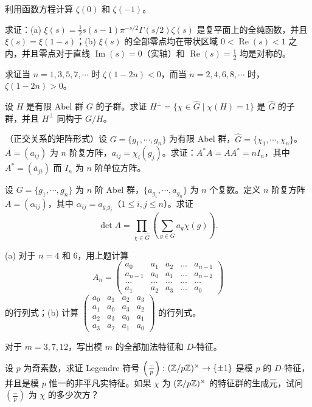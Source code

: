 \begin{Exercises}
  \item 利用函数方程计算 $\zeta(0)$ 和 $\zeta(-1)$。
  \item 求证：(a) $\xi(s)=\frac{1}{2}s(s-1)\pi^{-s/2}\Gamma(s/2)\zeta(s)$ 是复平面上的全纯函数，并且 $\xi(s)=\xi(1-s)$；(b) $\xi(s)$ 的全部零点均在带状区域 $0<\operatorname{Re}(s)<1$ 之内，并且零点对于直线 $\operatorname{Im}(s)=0$（实轴）和 $\operatorname{Re}(s)=\frac{1}{2}$ 均是对称的。
  \item 求证当 $n=1,3,5,7,\cdots$ 时 $\zeta(1-2n)<0$，而当 $n=2,4,6,8,\cdots$ 时，$\zeta(1-2n)>0$。
  \item 设 $H$ 是有限 Abel 群 $G$ 的子群。求证 $H^{\perp}=\{\chi\in\widehat{G}\mid\chi(H)=1\}$ 是 $\widehat{G}$ 的子群，并且 $H^{\perp}$ 同构于 $G/H$。
  \item （正交关系的矩阵形式）设 $G=\{g_1,\cdots,g_n\}$ 为有限 Abel 群，$\widehat{G}=\{\chi_1,\cdots,\chi_n\}$。$A=(a_{ij})$ 为 $n$ 阶复方阵，$a_{ij}=\chi_i(g_j)$。求证：$A^*A=AA^*=nI_n$，其中 $A^*=(\overline{a}_{ji})$ 而 $I_n$ 为 $n$ 阶单位方阵。
  \item 设 $G=\{g_1,\cdots,g_n\}$ 为 $n$ 阶 Abel 群，$\{a_{g_1},\cdots,a_{g_n}\}$ 为 $n$ 个复数。定义 $n$ 阶复方阵 $A=(\alpha_{ij})$，其中 $\alpha_{ij}=a_{g_ig_j}$（$1\leqslant i,j\leqslant n$）。求证
  \[
    \det A=\prod_{\chi\in\widehat{G}}\left(\sum_{g\in G}a_g\chi(g)\right).
  \]
  \item (a) 对于 $n=4$ 和 $6$，用上题计算
  \[
    A_n=\begin{pmatrix}
      a_0 & a_1 & a_2 & \dots & a_{n-1}\\
      a_{n-1} & a_0 & a_1 & \dots & a_{n-2}\\
      \dots & \dots & \dots & \dots & \dots\\
      a_1 & a_2 & a_3 & \dots & a_0
    \end{pmatrix}
  \]
  的行列式；(b) 计算 $\begin{pmatrix}a_0 & a_1 & a_2 & a_3\\ a_1 & a_0 & a_3 & a_2\\ a_2 & a_3 & a_0 & a_1\\ a_3 & a_2 & a_1 & a_0\end{pmatrix}$ 的行列式。
  \item 对于 $m=3,7,12$，写出模 $m$ 的全部加法特征和 $D$-特征。
  \item 设 $p$ 为奇素数，求证 Legendre 符号 $\left(\frac{-}{p}\right)\colon(\mathbb{Z}/p\mathbb{Z})^{\times}\to\{\pm1\}$ 是模 $p$ 的 $D$-特征，并且是模 $p$ 惟一的非平凡实特征。如果 $\chi$ 为 $(\mathbb{Z}/p\mathbb{Z})^{\times}$ 的特征群的生成元，试问 $\left(\frac{-}{p}\right)$ 为 $\chi$ 的多少次方？

\end{Exercises}
